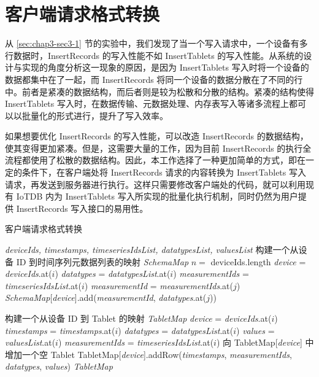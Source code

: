 \section{客户端请求格式转换}
从 \ref{sec:chap3-sec3-1} 节的实验中，我们发现了当一个写入请求中，一个设备有多行数据时，InsertRecords 的写入性能不如 InsertTablets 的写入性能。从系统的设计与实现的角度分析这一现象的原因，是因为 InsertTablets 写入时将一个设备的数据都集中在了一起，而 InsertRecords 将同一个设备的数据分散在了不同的行中。前者是紧凑的数据结构，而后者则是较为松散和分散的结构。紧凑的结构使得 InsertTablets 写入时，在数据传输、元数据处理、内存表写入等诸多流程上都可以以批量化的形式进行，提升了写入效率。

如果想要优化 InsertRecords 的写入性能，可以改造 InsertRecords 的数据结构，使其变得更加紧凑。但是，这需要大量的工作，因为目前 InsertRecords 的执行全流程都使用了松散的数据结构。因此，本工作选择了一种更加简单的方式，即在一定的条件下，在客户端处将 InsertRecords 请求的内容转换为 InsertTablets 写入请求，再发送到服务器进行执行。这样只需要修改客户端处的代码，就可以利用现有 IoTDB 内为 InsertTablets 写入所实现的批量化执行机制，同时仍然为用户提供 InsertRecords 写入接口的易用性。

\begin{algorithm}
  \caption{客户端请求格式转换}
  \label{alg:client-req-convert}
  \small
  \begin{algorithmic}
    \REQUIRE \emph{deviceIds, timestamps, timeseriesIdsList, datatypesList, valuesList}
    \STATE 构建一个从设备 ID 到时间序列元数据列表的映射 \emph{SchemaMap}
    \STATE $n = $ deviceIds.length
      \STATE \emph{device} =  \emph{deviceIds}.at($i$)
      \STATE \emph{datatypes} = \emph{datatypesList}.at($i$)
      \STATE \emph{measurementIds} = \emph{timeseriesIdsList}.at($i$)
        \STATE \emph{measurementId} = \emph{measurementIds}.at($j$)
          \STATE \emph{SchemaMap}[\emph{device}].add(\emph{measurementId}, \emph{datatypes}.at($j$))
        \ENDIF
      \ENDFOR
    \ENDFOR

    \STATE 构建一个从设备 ID 到 Tablet 的映射 \emph{TabletMap}
      \STATE \emph{device} =  \emph{deviceIds}.at($i$)
      \STATE \emph{timestamps} = \emph{timestamps}.at($i$)
      \STATE \emph{datatypes} = \emph{datatypesList}.at($i$)
      \STATE \emph{values} = \emph{valuesList}.at($i$)
      \STATE \emph{measurementIds} = \emph{timeseriesIdsList}.at($i$)
        \STATE 向 TabletMap[\emph{device}] 中增加一个空 Tablet
      \ENDIF 
      \STATE TabletMap[\emph{device}].addRow(\emph{timestamps}, \emph{measurementIds}, \emph{datatypes}, \emph{values})
    \ENDFOR
    \RETURN \emph{TabletMap}
  \end{algorithmic}
\end{algorithm}

